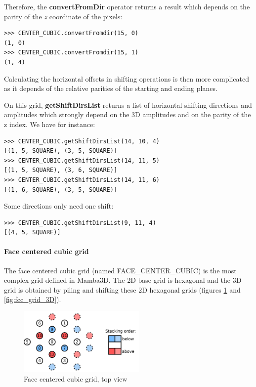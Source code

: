 \documentclass[a4paper,10pt,oneside]{article}
\begin{document}
Therefore, the \textbf{convertFromDir} operator returns a result which depends on the parity of the \emph{z} coordinate of the pixels:

\lstset{language=Python}
\begin{lstlisting}
>>> CENTER_CUBIC.convertFromdir(15, 0)
(1, 0)
>>> CENTER_CUBIC.convertFromdir(15, 1)
(1, 4)
\end{lstlisting}

Calculating the horizontal offsets in shifting operations is then more complicated as it depends of the relative parities
of the starting and ending planes.

On this grid, \textbf{getShiftDirsList} returns a list of horizontal shifting directions and amplitudes which strongly depend
on the 3D amplitudes and on the parity of the z index. We have for instance:

\lstset{language=Python}
\begin{lstlisting}
>>> CENTER_CUBIC.getShiftDirsList(14, 10, 4)
[(1, 5, SQUARE), (3, 5, SQUARE)]
>>> CENTER_CUBIC.getShiftDirsList(14, 11, 5)
[(1, 5, SQUARE), (3, 6, SQUARE)]
>>> CENTER_CUBIC.getShiftDirsList(14, 11, 6)
[(1, 6, SQUARE), (3, 5, SQUARE)]
\end{lstlisting}

Some directions only need one shift:

\lstset{language=Python}
\begin{lstlisting}
>>> CENTER_CUBIC.getShiftDirsList(9, 11, 4)
[(4, 5, SQUARE)]
\end{lstlisting}

\paragraph{Face centered cubic grid\\}

The face centered cubic grid (named FACE\_CENTER\_CUBIC) is the most complex grid defined in Mamba3D. The 2D base grid is hexagonal
and the 3D grid is obtained by piling and shifting these 2D hexagonal grids (figures \ref{fig:fcc_grid} and \ref{fig:fcc_grid_3D}).

\begin{figure}
\centering
\includegraphics[width=0.55\textwidth]{figures/fcc_grid.pdf}
\caption{Face centered cubic grid, top view}
\label{fig:fcc_grid}
\end{figure}
\end{document}
